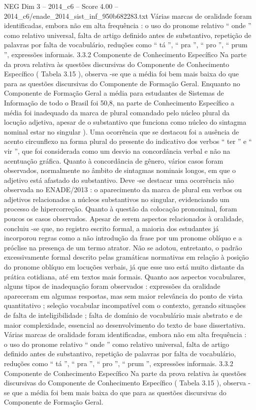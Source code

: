 \begin{textsample}{NEG Dim 3 – 2014\_c6 – Score 4.00 – 2014\_c6/enade\_2014\_sist\_inf\_950b682283.txt}
Várias marcas de oralidade foram identificadas, embora não em alta frequência : o uso do pronome relativo “ onde ” como relativo universal, falta de artigo definido antes de substantivo, repetição de palavras por falta de vocabulário, reduções como “ tá ”, “ pra ”, “ pro ”, “ prum ”, expressões informais. 3.3.2 Componente de Conhecimento Específico Na parte da prova relativa às questões discursivas do Componente de Conhecimento Específico ( Tabela 3.15 ), observa -se que a média foi bem mais baixa do que para as questões discursivas do Componente de Formação Geral.
Enquanto no Componente de Formação Geral a média para estudantes de Sistemas de Informação de todo o Brasil foi 50,8, na parte de Conhecimento Específico a média foi inadequado da marca de plural comandado pelo núcleo plural da locução adjetiva, apesar de o substantivo que funciona como núcleo do sintagma nominal estar no singular ).
Uma ocorrência que se destacou foi a ausência de acento circunflexo na forma plural do presente do indicativo dos verbos “ ter ” e “ vir ”, que foi considerada como um desvio na concordância verbal e não na acentuação gráfica.
Quanto à concordância de gênero, vários casos foram observados, normalmente no âmbito de sintagmas nominais longos, em que o adjetivo está afastado do substantivo.
Deve -se destacar uma ocorrência não observada no ENADE/2013 : o aparecimento da marca de plural em verbos ou adjetivos relacionados a núcleos substantivos no singular, evidenciando um processo de hipercorreção.
Quanto à questão da colocação pronominal, foram poucos os casos observados.
Apesar de serem aspectos relacionados à oralidade, concluiu -se que, no registro escrito formal, a maioria dos estudantes já incorporou regras como a não introdução da frase por um pronome oblíquo e a próclise na presença de um termo atrator.
Não se adotou, entretanto, o padrão excessivamente formal descrito pelas gramáticas normativas em relação à posição do pronome oblíquo em locuções verbais, já que esse uso está muito distante da prática cotidiana, até em textos mais formais.
Quanto aos aspectos vocabulares, alguns tipos de inadequação foram observados : expressões da oralidade apareceram em algumas respostas, mas sem maior relevância do ponto de vista quantitativo ; seleção vocabular incompatível com o contexto, gerando situações de falta de inteligibilidade ; falta de domínio de vocabulário mais abstrato e de maior complexidade, essencial ao desenvolvimento do texto de base dissertativa.
Várias marcas de oralidade foram identificadas, embora não em alta frequência : o uso do pronome relativo “ onde ” como relativo universal, falta de artigo definido antes de substantivo, repetição de palavras por falta de vocabulário, reduções como “ tá ”, “ pra ”, “ pro ”, “ prum ”, expressões informais. 3.3.2 Componente de Conhecimento Específico Na parte da prova relativa às questões discursivas do Componente de Conhecimento Específico ( Tabela 3.15 ), observa -se que a média foi bem mais baixa do que para as questões discursivas do Componente de Formação Geral.

\end{textsample}
